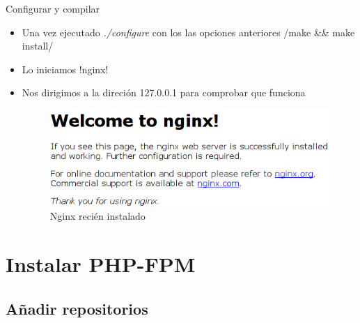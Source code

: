 \documentclass{beamer}
\begin{document}
\begin{frame}{Configurar y compilar}
  \begin{itemize}
  \item {
    Una vez ejecutado \emph{./configure} con los las opciones anteriores
    /make && make install/
    \pause %
  }
  \item {
    Lo iniciamos
    !nginx!
  }
  \item<3-> {
    Nos dirigimos a la direción 127.0.0.1 para comprobar que funciona
        \begin{figure}[H]
        \centering
        \includegraphics[scale=.2]{./img/instalacionNginx.png}
        \caption{Nginx recién instalado}
        \label{nginx1}
        \end{figure}
  }
  \end{itemize}
\end{frame}

\section{Instalar PHP-FPM}

\subsection{Añadir repositorios}
\end{document}
